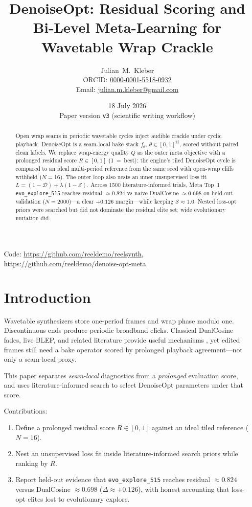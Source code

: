\documentclass[11pt,a4paper]{article}
\title{DenoiseOpt: Residual Scoring and Bi-Level Meta-Learning for Wavetable Wrap Crackle}
\author{Julian~M.~Kleber\\ORCID: \href{https://orcid.org/0000-0001-5518-0932}{0000-0001-5518-0932}\\Email: \href{mailto:julian.m.kleber@gmail.com}{julian.m.kleber@gmail.com}}
\date{18 July 2026 \\ \small Paper version \texttt{v3} (scientific writing workflow)}
\begin{document}
\maketitle
\begin{center}\small Code: \url{https://github.com/reeldemo/reelsynth}, \url{https://github.com/reeldemo/denoise-opt-meta}\end{center}
\begin{abstract}
Open wrap seams in periodic wavetable cycles inject audible crackle under cyclic playback. DenoiseOpt is a seam-local bake stack $f_\theta$, $\theta\in[0,1]^{12}$, scored without paired clean labels. We replace wrap-energy quality $Q$ as the outer meta objective with a prolonged residual score $R\in[0,1]$ (1~=~best): the engine's tiled DenoiseOpt cycle is compared to an ideal multi-period reference from the same seed with open-wrap cliffs withheld ($N{=}16$). The outer loop also nests an inner unsupervised loss fit $L=(1-\mathcal{D})+\lambda(1-\mathcal{S})$. Across 1500 literature-informed trials, Meta Top~1 \texttt{evo\_explore\_515} reaches residual $\approx 0.824$ vs naive DualCosine $\approx 0.698$ on held-out validation ($N{=}2000$)---a clear $+0.126$ margin---while keeping $\mathcal{S}\approx 1.0$. Nested loss-opt priors were searched but did not dominate the residual elite set; wide evolutionary mutation did.
\end{abstract}
\section{Introduction}
Wavetable synthesizers store one-period frames and wrap phase modulo one.
Discontinuous ends produce periodic broadband clicks. Classical DualCosine fades,
live BLEP, and related literature provide useful mechanisms
\cite{valimaki2006va,esqueda2016aliasing,esqueda2016blamp}, yet edited frames still
need a bake operator scored by prolonged playback agreement---not only a seam-local
proxy.

This paper separates \emph{seam-local} diagnostics from a \emph{prolonged}
evaluation score, and uses literature-informed search to select DenoiseOpt
parameters under that score.

Contributions:
\begin{enumerate}
  \item Define a prolonged residual score $R\in[0,1]$ against an ideal tiled reference ($N{=}16$).
  \item Nest an unsupervised loss fit inside literature-informed search priors while ranking by $R$.
  \item Report held-out evidence that \texttt{evo\_explore\_515} reaches residual $\approx 0.824$ versus DualCosine $\approx 0.698$ ($\Delta\approx +0.126$), with honest accounting that loss-opt elites lost to evolutionary explore.
\end{enumerate}
\end{document}
